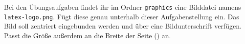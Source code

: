 Bei den Übungsaufgaben findet ihr im Ordner \texttt{graphics} eine Bilddatei namens \texttt{latex-logo.png}. Fügt diese genau unterhalb dieser Aufgabenstellung ein. Das Bild soll zentriert eingebunden werden und über eine Bildunterschrift verfügen. Passt die Größe außerdem an die Breite der Seite (\texttt{\textwidth}) an.


